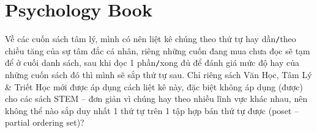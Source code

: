 \documentclass{article}
\begin{document}

\section{Psychology Book}
Về các cuốn sách tâm lý, mình có nên liệt kê chúng theo thứ tự hay dần\texttt{/}theo chiều tăng của sự tâm đắc cá nhân, riêng những cuốn đang mua chưa đọc sẽ tạm để ở cuối danh sách, sau khi đọc 1 phần\texttt{/}xong đủ để đánh giá mức độ hay của những cuốn sách đó thì mình sẽ sắp thứ tự sau. Chỉ riêng sách Văn Học, Tâm Lý \& Triết Học mới được áp dụng cách liệt kê này, đặc biệt không áp dụng (được) cho các sách STEM -- đơn giản vì chúng hay theo nhiều lĩnh vực khác nhau, nên không thể nào sắp duy nhất 1 thứ tự trên 1 tập hợp bán thứ tự được (poset -- partial ordering set)?
\end{document}
